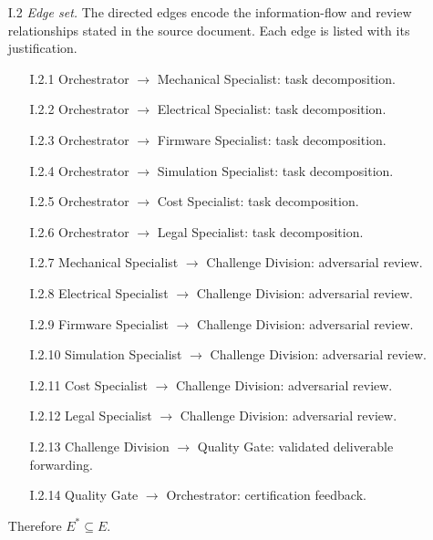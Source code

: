 \documentclass[12pt]{article}
\theoremstyle{definition}
\begin{document}
\begin{enumerate}
    \item[I.2] \emph{Edge set.}  The directed edges encode the
               information-flow and review relationships stated in the
               source document.  Each edge is listed with its
               justification.
               \begin{enumerate}
                   \item[I.2.1] Orchestrator $\to$ Mechanical Specialist:
                                task decomposition.
                   \item[I.2.2] Orchestrator $\to$ Electrical Specialist:
                                task decomposition.
                   \item[I.2.3] Orchestrator $\to$ Firmware Specialist:
                                task decomposition.
                   \item[I.2.4] Orchestrator $\to$ Simulation Specialist:
                                task decomposition.
                   \item[I.2.5] Orchestrator $\to$ Cost Specialist:
                                task decomposition.
                   \item[I.2.6] Orchestrator $\to$ Legal Specialist:
                                task decomposition.
                   \item[I.2.7] Mechanical Specialist $\to$ Challenge Division:
                                adversarial review.
                   \item[I.2.8] Electrical Specialist $\to$ Challenge Division:
                                adversarial review.
                   \item[I.2.9] Firmware Specialist $\to$ Challenge Division:
                                adversarial review.
                   \item[I.2.10] Simulation Specialist $\to$ Challenge Division:
                                 adversarial review.
                   \item[I.2.11] Cost Specialist $\to$ Challenge Division:
                                 adversarial review.
                   \item[I.2.12] Legal Specialist $\to$ Challenge Division:
                                 adversarial review.
                   \item[I.2.13] Challenge Division $\to$ Quality Gate:
                                 validated deliverable forwarding.
                   \item[I.2.14] Quality Gate $\to$ Orchestrator:
                                 certification feedback.
               \end{enumerate}
               Therefore $E^{*} \subseteq E$. \checkmark


\end{enumerate}
\end{document}
